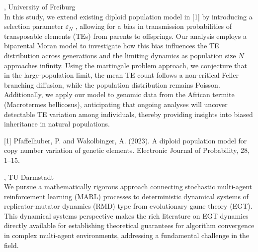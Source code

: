 \documentclass[12pt,a4paper]{article}
\begin{document}
\bigskip\bigskip


\bigskip\bigskip

, University of Freiburg \\[2ex] In this study, we extend existing diploid population model in [1] by introducing a selection parameter $\varepsilon_N$ , allowing for a bias in transmission probabilities of transposable elements (TEs) from parents to offsprings. Our analysis employs a biparental Moran model to investigate how this bias influences the TE distribution across generations and the limiting dynamics as population size $N$ approaches infinity. Using the martingale problem approach, we conjecture that in the large-population limit, the mean TE count follows a non-critical Feller branching diffusion, while the population distribution remains Poisson. Additionally, we apply our model to genomic data from the African termite (Macrotermes bellicosus), anticipating that ongoing analyses will uncover detectable TE variation among individuals, thereby providing insights into biased inheritance in natural populations. 

 [1] Pfaffelhuber, P. and Wakolbinger, A. (2023). A diploid population model for copy number variation of genetic elements. Electronic Journal of Probability, 28, 1--15. 

\bigskip\bigskip

, TU Darmstadt \\[2ex] We pursue a mathematically rigorous approach connecting stochastic multi-agent reinforcement learning (MARL) processes to deterministic dynamical systems of replicator-mutator dynamics (RMD) type from evolutionary game theory (EGT). This dynamical systems perspective makes the rich literature on EGT dynamics directly available for establishing theoretical guarantees for algorithm convergence in complex multi-agent environments, addressing a fundamental challenge in the field. 
\end{document}
